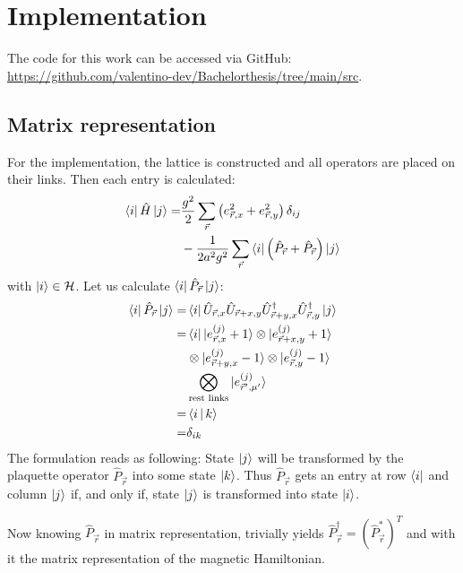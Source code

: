 \section{Implementation}
The code for this work can be accessed via GitHub: \url{https://github.com/valentino-dev/Bachelorthesis/tree/main/src}.
\subsection{Matrix representation}
For the implementation, the lattice is constructed and all operators are placed on their links. Then each entry is calculated:
\begin{align*}
	\bra{i}\hat{H}\ket{j} = & \frac{g^2}{2}\sum_{\vec{r}}\left(e_{\vec{r}, x}^2+e_{\vec{r}, y}^2\right)\delta_{ij}           \\
	                        & -\frac{1}{2a^2g^2}\sum_{\vec{r}}\bra{i}\left(\hat{P}_{\vec{r}}+\hat{P}_{\vec{r}}\right)\ket{j}
\end{align*}
with $\ket{i}\in\cal{H}$. Let us calculate $\bra{i}\hat{P}_{\vec{r}}\ket{j}$:
\begin{align*}
	\bra{i}\hat{P}_{\vec{r}}\ket{j}= & \bra{i}\hat{U}_{\vec{r}, x}\hat{U}_{\vec{r}+x,y}\hat{U}^{\dag}_{\vec{r}+y,x}\hat{U}^{\dag}_{\vec{r},y}\ket{j} \\
	=                                & \bra{i}\ket{e^{(j)}_{\vec{r}, x}+1}\otimes\ket{e^{(j)}_{\vec{r}+x, y}+1}                                      \\
	                                 & \otimes\ket{e^{(j)}_{\vec{r}+y, x}-1}\otimes\ket{e^{(j)}_{\vec{r}, y}-1}                                      \\
	                                 & \bigotimes_\text{rest links}\ket{e^{(j)}_{\vec{r}', \mu'}}                                                    \\
	=                                & \Braket{i|k}                                                                                                  \\
	=                                & \delta_{ik}
\end{align*}
The formulation reads as following: State $\ket{j}$ will be transformed by the plaquette operator $\hat{P}_{\vec{r}}$ into some state $\ket{k}$. Thus $\hat{P}_{\vec{r}}$ gets an entry at row $\bra{i}$ and column $\ket{j}$ if, and only if, state $\ket{j}$ is transformed into state $\ket{i}$.

Now knowing $\hat{P}_{\vec{r}}$ in matrix representation, trivially yields $\hat{P}_{\vec{r}}^{\dag}=\left(\hat{P}_{\vec{r}}^{*}\right)^{T}$ and with it the matrix representation of the magnetic Hamiltonian.

